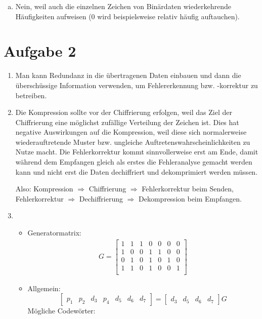 \documentclass[11pt]{article} %
\theoremstyle{definition}
\begin{document}
\begin{enumerate}[a)]
\item Nein, weil auch die einzelnen Zeichen von Binärdaten wiederkehrende Häufigkeiten aufweisen (0 wird beispielsweise relativ häufig auftauchen).

\end{enumerate}

\section*{Aufgabe 2}

\begin{enumerate}[1.]
\item Man kann Redundanz in die übertragenen Daten einbauen und dann die überschüssige Information verwenden, um Fehlererkennung bzw. -korrektur zu betreiben.

\item Die Kompression sollte vor der Chiffrierung erfolgen, weil das Ziel der Chiffrierung eine möglichst zufällige Verteilung der Zeichen ist. Dies hat negative Auswirkungen auf die Kompression, weil diese sich normalerweise wiederauftretende Muster bzw. ungleiche Auftretenswahrscheinlichkeiten zu Nutze macht. Die Fehlerkorrektur kommt sinnvollerweise erst am Ende, damit während dem Empfangen gleich als erstes die Fehleranalyse gemacht werden kann und nicht erst die Daten dechiffriert und dekomprimiert werden müssen.

Also: Kompression $\Rightarrow$ Chiffrierung $\Rightarrow$ Fehlerkorrektur beim Senden, Fehlerkorrektur $\Rightarrow$ Dechiffrierung $\Rightarrow$ Dekompression beim Empfangen.

\item

\begin{itemize}

\item Generatormatrix:
\begin{eqnarray*}
G = \begin{bmatrix}
1 & 1 & 1 & 0 & 0 & 0 & 0 \\
1 & 0 & 0 & 1 & 1 & 0 & 0 \\
0 & 1 & 0 & 1 & 0 & 1 & 0 \\
1 & 1 & 0 & 1 & 0 & 0 & 1 \\
\end{bmatrix}
\end{eqnarray*}

\item Allgemein:
\[
\begin{bmatrix} p_1 & p_2 & d_3 & p_4 & d_5 & d_6 & d_7 \end{bmatrix} = \begin{bmatrix} d_3 & d_5 & d_6 & d_7 \end{bmatrix} G
\]
Mögliche Codewörter:


\end{itemize}
\end{enumerate}
\end{document}
